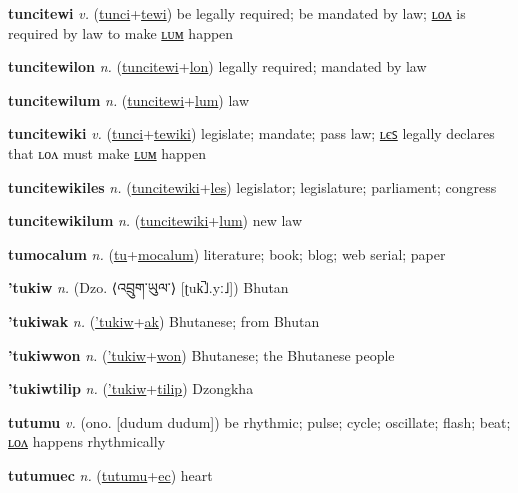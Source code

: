 \textbf{\hypertarget{tuncitewi}{tuncitewi}} \textit{v.} (\hyperlink{tunci}{tunci}+\allowbreak \hyperlink{tewi}{tewi})
be legally required; be mandated by law; \hyperlink{tuncitewilon}{ʟᴏᴧ} is required by law to make \hyperlink{tuncitewilum}{ʟᴜᴍ} happen

\textbf{\hypertarget{tuncitewilon}{tuncitewilon}} \textit{n.} (\hyperlink{tuncitewi}{tuncitewi}+\allowbreak \hyperlink{lon}{lon})
legally required; mandated by law

\textbf{\hypertarget{tuncitewilum}{tuncitewilum}} \textit{n.} (\hyperlink{tuncitewi}{tuncitewi}+\allowbreak \hyperlink{lum}{lum})
law

\textbf{\hypertarget{tuncitewiki}{tuncitewiki}} \textit{v.} (\hyperlink{tunci}{tunci}+\allowbreak \hyperlink{tewiki}{tewiki})
legislate; mandate; pass law; \hyperlink{tuncitewikiles}{ʟєꜱ} legally declares that ʟᴏᴧ must make \hyperlink{tuncitewikilum}{ʟᴜᴍ} happen

\textbf{\hypertarget{tuncitewikiles}{tuncitewikiles}} \textit{n.} (\hyperlink{tuncitewiki}{tuncitewiki}+\allowbreak \hyperlink{les}{les})
legislator; legislature; parliament; congress

\textbf{\hypertarget{tuncitewikilum}{tuncitewikilum}} \textit{n.} (\hyperlink{tuncitewiki}{tuncitewiki}+\allowbreak \hyperlink{lum}{lum})
new law

\textbf{\hypertarget{tumocalum}{tumocalum}} \textit{n.} (\hyperlink{tu}{tu}+\allowbreak \hyperlink{mocalum}{mocalum})
literature; book; blog; web serial; paper

\textbf{\hypertarget{'tukiw}{'tukiw}} \textit{n.} (Dzo. ⟨{\tibetan{}འབྲུག་ཡུལ་}⟩ [ʈuk̚˩.yː˩])
Bhutan

\textbf{\hypertarget{'tukiwak}{'tukiwak}} \textit{n.} (\hyperlink{'tukiw}{'tukiw}+\allowbreak \hyperlink{ak}{ak})
Bhutanese; from Bhutan

\textbf{\hypertarget{'tukiwwon}{'tukiwwon}} \textit{n.} (\hyperlink{'tukiw}{'tukiw}+\allowbreak \hyperlink{won}{won})
Bhutanese; the Bhutanese people

\textbf{\hypertarget{'tukiwtilip}{'tukiwtilip}} \textit{n.} (\hyperlink{'tukiw}{'tukiw}+\allowbreak \hyperlink{tilip}{tilip})
Dzongkha

\textbf{\hypertarget{tutumu}{tutumu}} \textit{v.} (ono. [dudum dudum])
be rhythmic; pulse; cycle; oscillate; flash; beat; \hyperlink{tutumulon}{ʟᴏᴧ} happens rhythmically

\textbf{\hypertarget{tutumuec}{tutumuec}} \textit{n.} (\hyperlink{tutumu}{tutumu}+\allowbreak \hyperlink{ec}{ec})
heart

